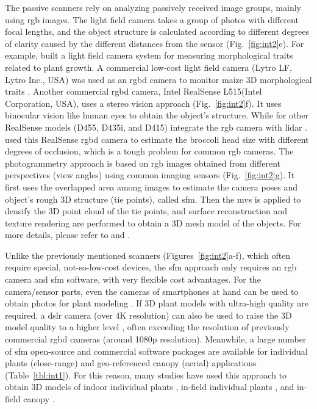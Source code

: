 The passive scanners rely on analyzing passively received image groups, mainly using \gls{rgb} images. The light field camera takes a group of photos with different focal lengths, and the object structure is calculated according to different degrees of clarity caused by the different distances from the sensor (Fig.~\ref{fig:int2}e). For example, \citet{apelt_phytotyping_2015} built a light field camera system for measuring morphological traits related to plant growth. A commercial low-cost light field camera (Lytro LF, Lytro Inc., USA) was used as an \gls{rgbd} camera to monitor maize 3D morphological traits \citep{schima_imagine_2016}. Another commercial \gls{rgbd} camera, Intel RealSense L515(Intel Corporation, USA), uses a stereo vision approach (Fig.~\ref{fig:int2}f). It uses binocular vision like human eyes to obtain the object's structure. While for other RealSense models (D455, D435i, and D415) integrate the \gls{rgb} camera with \gls{lidar} \citep[Table 5]{bartol_review_2021}. \citet{blok_image_2021} used this RealSense \gls{rgbd} camera to estimate the broccoli head size with different degrees of occlusion, which is a tough problem for common \gls{rgb} cameras. The photogrammetry approach is based on \gls{rgb} images obtained from different perspectives (view angles) using common imaging sensors (Fig.~\ref{fig:int2}g). It first uses the overlapped area among images to estimate the camera poses and object's rough 3D structure (tie points), called \acrfull{sfm}. Then the \gls{mvs} is applied to densify the 3D point cloud of the tie points, and surface reconstruction and texture rendering are performed to obtain a 3D mesh model of the objects. For more details, please refer to \citet{hartley_multiple_2000} and \citet{snavely_scene_2010}.

Unlike the previously mentioned scanners (Figures~\ref{fig:int2}a-f), which often require special, not-so-low-cost devices, the \gls{sfm} approach only requires an \gls{rgb} camera and \gls{sfm} software, with very flexible cost advantages. For the camera/sensor parts, even the cameras of smartphones at hand can be used to obtain photos for plant modeling \citep{li_measuring_2020}. If 3D plant models with ultra-high quality are required, a \gls{dslr} camera (over 4K resolution) can also be used to raise the 3D model quality to a higher level \citep{nguyen_3d_2016, drofova_use_2023}, often exceeding the resolution of previously commercial \gls{rgbd} cameras (around 1080p resolution). Meanwhile, a large number of \gls{sfm} open-source and commercial software packages are available for individual plants (close-range) and geo-referenced canopy (aerial) applications (Table~\ref{tbl:int1}). For this reason, many studies have used this approach to obtain 3D models of indoor individual plants \citep{wu_mvs-pheno_2020, zhou_automated_2019}, in-field individual plants \citep{jay_field_2015, herrero_structural_2023}, and in-field canopy \citep{kim_modeling_2018, herrero_canopy_2020}.

